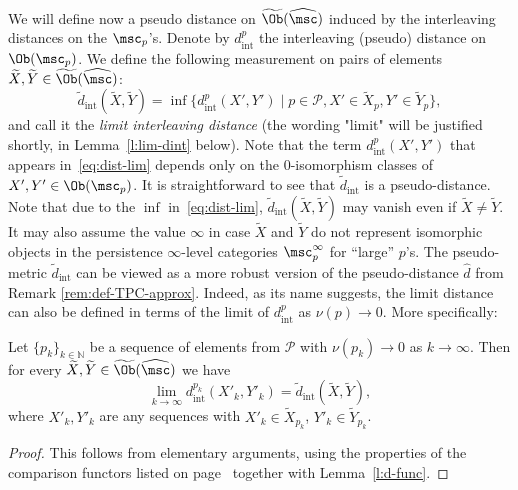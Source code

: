 We will define now a pseudo distance on
  $\widetilde{\Ob}(\widehat{\msc})$ induced by the interleaving
  distances on the $\msc_p$'s.
  Denote by $d^p_{\text{int}}$
  the interleaving (pseudo) distance on $\Ob(\msc_p)$. We define the
  following measurement on pairs of elements
  $\widetilde{X}, \widetilde{Y} \in \widetilde{\Ob}(\widehat{\msc})$:
\begin{equation} \label{eq:dist-lim}
  \widetilde{d}_{\text{int}}(\widetilde{X}, \widetilde{Y}) = \inf
  \bigl\{ d^p_{\text{int}}(X',Y') \mid p \in \mathcal{P}, X' \in
  \widetilde{X}_p, Y' \in \widetilde{Y}_p \bigr\},
\end{equation}
and call it the {\em limit interleaving distance} (the wording "limit"
will be justified shortly, in Lemma~\ref{l:lim-dint} below). Note that
the term $d^p_{\text{int}}(X',Y')$ that appears in~\eqref{eq:dist-lim}
depends only on the $0$-isomorphism classes of
$X', Y' \in \Ob(\msc_p)$. It is straightforward to see that
$\widetilde{d}_{\text{int}}$ is a pseudo-distance. Note that due to
the $\inf$ in~\eqref{eq:dist-lim},
$\widetilde{d}_{\text{int}}(\widetilde{X}, \widetilde{Y})$ may vanish
even if $\widetilde{X} \neq \widetilde{Y}$. It may also assume the
value $\infty$ in case $\widetilde{X}$ and $\widetilde{Y}$ do not
represent isomorphic objects in the persistence $\infty$-level
categories $\msc^{\infty}_p$ for ``large'' $p$'s. The pseudo-metric
$\widetilde{d}_{\text{int}}$ can be viewed as a more robust version of
the pseudo-distance $\hat{d}$ from Remark
\ref{rem:def-TPC-approx}. Indeed, as its name suggests, the limit
distance can also be defined in terms of the limit of
$d^p_{\text{int}}$ as $\nu(p) \longrightarrow 0$.
More
specifically:
\begin{lem} \label{l:lim-dint} Let $\{p_k\}_{k \in \mathbb{N}}$ be a
  sequence of elements from $\mathcal{P}$ with
  $\nu(p_k) \longrightarrow 0$ as $k \longrightarrow \infty$. Then for
  every
  $\widetilde{X}, \widetilde{Y} \in \widetilde{\Ob}(\widehat{\msc})$
  we have
  $$\lim_{k \to \infty} d^{p_k}_{\text{int}}(X'_k,Y'_k) =
  \widetilde{d}_{\text{int}}(\widetilde{X},
  \widetilde{Y}),$$ where $X'_k, Y'_k$ are any sequences with $X'_k
  \in \widetilde{X}_{p_k}$, $Y'_k \in \widetilde{Y}_{p_k}$.
\end{lem}

\begin{proof}
  This follows from elementary arguments, using the properties of the
  comparison functors listed on page~\pageref{pp:sys-functors}
  together with Lemma~\ref{l:d-func}.
\end{proof}


